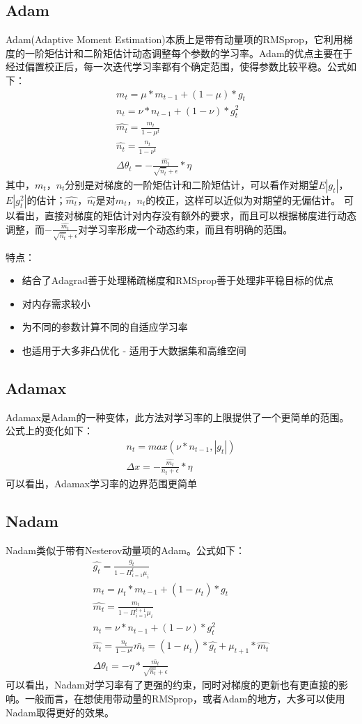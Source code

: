 \documentclass[hyperref, UTF-8]{ctexart}
\begin{document}
\subsection{Adam}
Adam(Adaptive Moment Estimation)本质上是带有动量项的RMSprop，它利用梯度的一阶矩估计和二阶矩估计动态调整每个参数的学习率。Adam的优点主要在于经过偏置校正后，每一次迭代学习率都有个确定范围，使得参数比较平稳。公式如下：
\begin{eqnarray*}
m_t=\mu*m_{t-1}+(1-\mu)*g_t \\
n_t=\nu*n_{t-1}+(1-\nu)*g_t^2 \\
\hat{m_t}=\frac{m_t}{1-\mu^t}  \\
\hat{n_t}=\frac{n_t}{1-\nu^t}  \\
\Delta{\theta_t}=-\frac{\hat{m_t}}{\sqrt{\hat{n_t}}+\epsilon}*\eta
\end{eqnarray*}
其中，$m_t$，$n_t$分别是对梯度的一阶矩估计和二阶矩估计，可以看作对期望$E|g_t|$，$E|g_t^2|$的估计；$\hat{m_t}$，$\hat{n_t}$是对$m_t$，$n_t$的校正，这样可以近似为对期望的无偏估计。 可以看出，直接对梯度的矩估计对内存没有额外的要求，而且可以根据梯度进行动态调整，而$-\frac{\hat{m_t}}{\sqrt{\hat{n_t}}+\epsilon}$对学习率形成一个动态约束，而且有明确的范围。

特点：
\begin{itemize}
\item 结合了Adagrad善于处理稀疏梯度和RMSprop善于处理非平稳目标的优点
\item 对内存需求较小
\item 为不同的参数计算不同的自适应学习率
\item 也适用于大多非凸优化 - 适用于大数据集和高维空间
\end{itemize}

\subsection{Adamax}
Adamax是Adam的一种变体，此方法对学习率的上限提供了一个更简单的范围。公式上的变化如下：
\begin{eqnarray*}
n_t=max(\nu*n_{t-1},|g_t|)  \\
\Delta{x}=-\frac{\hat{m_t}}{n_t+\epsilon}*\eta
\end{eqnarray*}
可以看出，Adamax学习率的边界范围更简单

\subsection{Nadam}
Nadam类似于带有Nesterov动量项的Adam。公式如下：
\begin{eqnarray*}
\hat{g_t}=\frac{g_t}{1-\Pi_{i=1}^t\mu_i}  \\
m_t=\mu_t*m_{t-1}+(1-\mu_t)*g_t  \\
\hat{m_t}=\frac{m_t}{1-\Pi_{i=1}^{t+1}\mu_i}  \\
n_t=\nu*n_{t-1}+(1-\nu)*g_t^2  \\
\hat{n_t}=\frac{n_t}{1-\nu^t}\bar{m_t}=(1-\mu_t)*\hat{g_t}+\mu_{t+1}*\hat{m_t}  \\
\Delta{\theta_t}=-\eta*\frac{\bar{m_t}}{\sqrt{\hat{n_t}}+\epsilon}
\end{eqnarray*}
可以看出，Nadam对学习率有了更强的约束，同时对梯度的更新也有更直接的影响。一般而言，在想使用带动量的RMSprop，或者Adam的地方，大多可以使用Nadam取得更好的效果。
\end{document}
